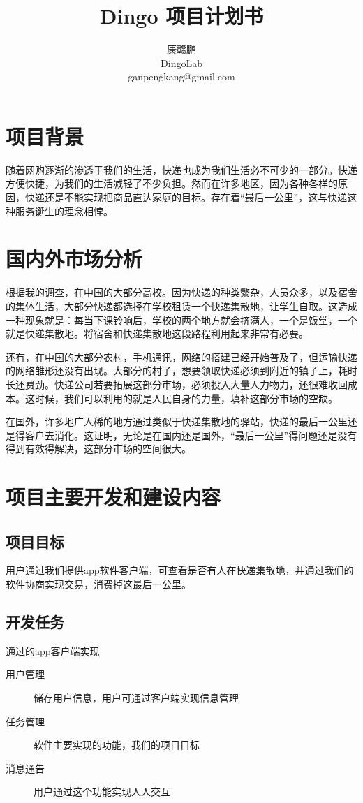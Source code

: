 \documentclass[UTF8]{dingo}
\author{康赣鹏 \\ DingoLab \\ganpengkang@gmail.com}
\title{Dingo 项目计划书}
\begin{document}
  \makecover
  \makecontents
  \section{项目背景}
  随着网购逐渐的渗透于我们的生活，快递也成为我们生活必不可少的一部分。快递方便快捷，为我们的生活减轻了不少负担。然而在许多地区，因为各种各样的原因，快递还是不能实现把商品直达家庭的目标。存在着“最后一公里”，这与快递这种服务诞生的理念相悖。
  \section{国内外市场分析}
  根据我的调查，在中国的大部分高校。因为快递的种类繁杂，人员众多，以及宿舍的集体生活，大部分快递都选择在学校租赁一个快递集散地，让学生自取。这造成一种现象就是：每当下课铃响后，学校的两个地方就会挤满人，一个是饭堂，一个就是快递集散地。将宿舍和快递集散地这段路程利用起来非常有必要。

  还有，在中国的大部分农村，手机通讯，网络的搭建已经开始普及了，但运输快递的网络雏形还没有出现。大部分的村子，想要领取快递必须到附近的镇子上，耗时长还费劲。快递公司若要拓展这部分市场，必须投入大量人力物力，还很难收回成本。这时候，我们可以利用的就是人民自身的力量，填补这部分市场的空缺。

  在国外，许多地广人稀的地方通过类似于快递集散地的驿站，快递的最后一公里还是得客户去消化。这证明，无论是在国内还是国外，“最后一公里”得问题还是没有得到有效得解决，这部分市场的空间很大。

  \section{项目主要开发和建设内容}
    \subsection{项目目标}
    用户通过我们提供app软件客户端，可查看是否有人在快递集散地，并通过我们的软件协商实现交易，消费掉这最后一公里。
    \subsection{开发任务}
    通过的app客户端实现
    \begin{description}
      \item[用户管理] 储存用户信息，用户可通过客户端实现信息管理
      \item[任务管理] 软件主要实现的功能，我们的项目目标
      \item[消息通告] 用户通过这个功能实现人人交互
    \end{description}
\end{document}
